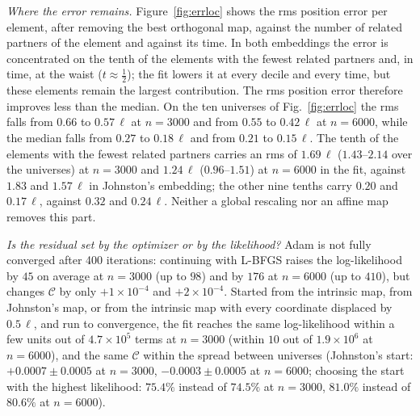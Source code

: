 \documentclass[prd,twocolumn,superscriptaddress,nofootinbib,amsmath,amssymb,floatfix]{revtex4-2}
\begin{document}
\emph{Where the error remains.} Figure~\ref{fig:errloc} shows the rms position error per element, after removing the best orthogonal map, against the number of related partners of the element and against its time. In both embeddings the error is concentrated on the tenth of the elements with the fewest related partners and, in time, at the waist ($t\approx\tfrac12$); the fit lowers it at every decile and every time, but these elements remain the largest contribution. The rms position error therefore improves less than the median. On the ten universes of Fig.~\ref{fig:errloc} the rms falls from $0.66$ to $0.57\,\ell$ at $n=3000$ and from $0.55$ to $0.42\,\ell$ at $n=6000$, while the median falls from $0.27$ to $0.18\,\ell$ and from $0.21$ to $0.15\,\ell$. The tenth of the elements with the fewest related partners carries an rms of $1.69\,\ell$ ($1.43$--$2.14$ over the universes) at $n=3000$ and $1.24\,\ell$ ($0.96$--$1.51$) at $n=6000$ in the fit, against $1.83$ and $1.57\,\ell$ in Johnston's embedding; the other nine tenths carry $0.20$ and $0.17\,\ell$, against $0.32$ and $0.24\,\ell$. Neither a global rescaling nor an affine map removes this part.

\emph{Is the residual set by the optimizer or by the likelihood?} Adam is not fully converged after 400 iterations: continuing with L-BFGS raises the log-likelihood by $45$ on average at $n=3000$ (up to $98$) and by $176$ at $n=6000$ (up to $410$), but changes $\mathcal C$ by only $+1\times10^{-4}$ and $+2\times10^{-4}$. Started from the intrinsic map, from Johnston's map, or from the intrinsic map with every coordinate displaced by $0.5\,\ell$, and run to convergence, the fit reaches the same log-likelihood within a few units out of $4.7\times10^5$ terms at $n=3000$ (within $10$ out of $1.9\times10^6$ at $n=6000$), and the same $\mathcal C$ within the spread between universes (Johnston's start: $+0.0007\pm0.0005$ at $n=3000$, $-0.0003\pm0.0005$ at $n=6000$; choosing the start with the highest likelihood: $75.4\%$ instead of $74.5\%$ at $n=3000$, $81.0\%$ instead of $80.6\%$ at $n=6000$).
\end{document}
